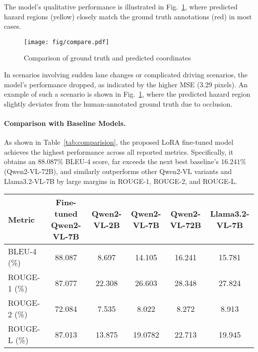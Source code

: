 % 
The model's qualitative performance is illustrated in Fig.~\ref{fig:qualitative_results}, where predicted hazard regions (yellow) closely match the ground truth annotations (red) in most cases.
\begin{figure}
    \centering
    \texttt{[image: fig/compare.pdf]}
    \caption{Comparison of ground truth and predicted coordinates}
    \label{fig:qualitative_results}
\end{figure}
% 
In scenarios involving sudden lane changes or complicated driving scenarios, the model's performance dropped, as indicated by the higher MSE (3.29 pixels). An example of such a scenario is shown in Fig.~\ref{fig:qualitative_results}, where the predicted hazard region slightly deviates from the human-annotated ground truth due to occlusion.

\paragraph{Comparison with Baseline Models.}
As shown in Table~\ref{tab:comparision}, the proposed LoRA fine-tuned model achieves the highest performance across all reported metrics.
Specifically, it obtains an $88.087\%$ BLEU-4 score, far exceeds the next best baseline’s $16.241\%$ (Qwen2-VL-72B), and similarly outperforms other Qwen2-VL variants and Llama3.2-VL-7B by large margins in ROUGE-1, ROUGE-2, and ROUGE-L.

\begin{table*}[hb]
\centering
\caption{Core Performance Metrics for Hazard Region Prediction}
\label{tab:comparision}
\begin{tabular}{lccccc}
\toprule
\textbf{Metric} & \textbf{Fine-tuned Qwen2-VL-7B}& \textbf{Qwen2-VL-2B} & \textbf{Qwen2-VL-7B} & \textbf{Qwen2-VL-72B} & \textbf{Llama3.2-VL-7B}  \\
\midrule
BLEU-4 (\%)     & 88.087 & 8.697 & 14.105 & 16.241 & 15.781    \\
ROUGE-1 (\%)    & 87.077 & 22.308 & 26.603 & 28.348 & 27.824    \\
ROUGE-2 (\%)    & 72.084 & 7.535 & 8.022 & 8.272 & 8.913   \\
ROUGE-L (\%)    & 87.013 & 13.875 & 19.0782 & 22.713 & 19.945  \\
\bottomrule
\end{tabular}
\end{table*}

